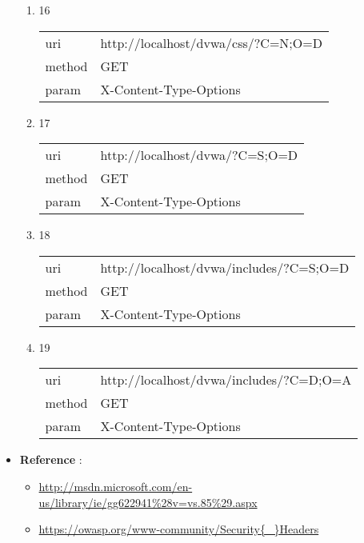 \documentclass[10pt]{article}
\begin{document}
\begin{itemize}
\begin{enumerate}
\item[] 16
\begin{tabular}{| l | p{14cm}}
uri & http://localhost/dvwa/css/?C=N;O=D \\
method & GET \\
param & X-Content-Type-Options \\
\end{tabular}
\item[] 17
\begin{tabular}{| l | p{14cm}}
uri & http://localhost/dvwa/?C=S;O=D \\
method & GET \\
param & X-Content-Type-Options \\
\end{tabular}
\item[] 18
\begin{tabular}{| l | p{14cm}}
uri & http://localhost/dvwa/includes/?C=S;O=D \\
method & GET \\
param & X-Content-Type-Options \\
\end{tabular}
\item[] 19
\begin{tabular}{| l | p{14cm}}
uri & http://localhost/dvwa/includes/?C=D;O=A \\
method & GET \\
param & X-Content-Type-Options \\
\end{tabular}
\end{enumerate}
\item[] \textbf{Reference} : 
\begin{itemize}
\item \url{http://msdn.microsoft.com/en-us/library/ie/gg622941\%28v=vs.85\%29.aspx}
\item \url{https://owasp.org/www-community/Security{\_}Headers}
\end{itemize}
\end{itemize}
\end{document}
